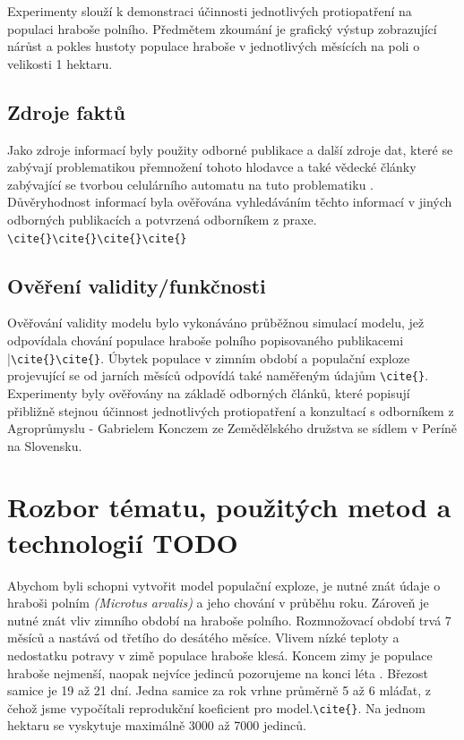 \documentclass[a4paper,11pt]{article}
\begin{document}
Experimenty slouží k demonstraci účinnosti jednotlivých protiopatření na populaci hraboše polního. Předmětem zkoumání je grafický výstup zobrazující nárůst  a  pokles hustoty populace hraboše v jednotlivých měsících na poli o velikosti 1 hektaru. 

\subsection{Zdroje faktů}
Jako zdroje informací byly použity odborné publikace a další zdroje dat, které se zabývají problematikou přemnožení tohoto hlodavce a také vědecké články zabývající se tvorbou celulárního automatu na tuto problematiku \cite{OurCA}. Důvěryhodnost informací byla ověřována vyhledáváním těchto informací v jiných odborných publikacích a potvrzená odborníkem z praxe. \verb|\cite{}|\verb|\cite{}|\verb|\cite{}|\verb|\cite{}|

\subsection{Ověření validity/funkčnosti}
Ověřování validity modelu bylo vykonáváno průběžnou simulací modelu, jež odpovídala chování populace hraboše polního popisovaného publikacemi \cite{diplom_Tkadlec}|\verb|\cite{}|\verb|\cite{}|. Úbytek populace v zimním období a populační exploze projevující se od jarních měsíců odpovídá také naměřeným údajům \verb|\cite{}|. Experimenty byly ověřovány na základě odborných článků, které popisují přibližně stejnou účinnost jednotlivých protiopatření a konzultací s odborníkem z Agroprůmyslu - Gabrielem Konczem ze Zemědělského družstva se sídlem v Períně na Slovensku.   

\section{Rozbor tématu, použitých metod a technologií TODO}
Abychom byli schopni vytvořit model populační exploze, je nutné znát údaje o hraboši polním \textit{(Microtus arvalis)} a jeho chování v průběhu roku.
 Zároveň je nutné znát vliv zimního období na hraboše polního. Rozmnožovací období trvá 7 měsíců a nastává od třetího do desátého měsíce. Vlivem nízké teploty a nedostatku potravy v zimě populace hraboše klesá. Koncem zimy je populace hraboše nejmenší, naopak nejvíce jedinců pozorujeme na konci léta \cite{Winter_temp}. Březost samice je 19 až 21 dní. Jedna samice za rok vrhne průměrně 5 až 6 mláďat, z čehož jsme vypočítali reprodukční koeficient pro model.\verb|\cite{}|. Na jednom hektaru se vyskytuje maximálně 3000 až 7000 jedinců. \cite{diplom_Tkadlec}
\end{document}
